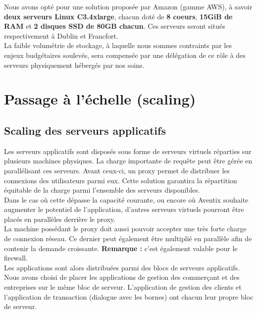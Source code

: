 Nous avons opté pour une solution proposée par Amazon (gamme AWS), à savoir
\textbf{deux serveurs Linux C3.4xlarge}, chacun doté de \textbf{8 coeurs},
\textbf{15GiB de RAM} et \textbf{2 disques SSD de 80GB chacun}. Ces serveurs
seront situés respectivement à Dublin et Francfort. \\

La faible volumétrie de stockage, à laquelle nous sommes contraints par les
enjeux budgétaires soulevés, sera compensée par une délégation de ce rôle à
des serveurs physiquement hébergés par nos soins.

\section{Passage à l'échelle (scaling)}
\label{sec:scaling}

\subsection{Scaling des serveurs applicatifs}
\label{subsec:scaling-applicatif}

Les serveurs applicatifs sont disposés sous forme de serveurs virtuels
réparties sur plusieurs machines physiques. La charge importante de requête
peut être gérée en parallélisant ces serveurs. Avant ceux-ci, un proxy permet
de distribuer les connexions des utilisateurs parmi eux. Cette solution
garantira la répartition équitable de la charge parmi l'ensemble des serveurs
disponibles. \\

Dans le cas où cette dépasse la capacité courante, ou encore où Aventix souhaite
augmenter le potentiel de l'application, d'autres serveurs virtuels pourront
être placés en parallèles derrière le proxy. \\

La machine possédant le proxy doit aussi pouvoir accepter une très forte charge
de connexion réseau. Ce dernier peut également être multiplié en parallèle afin
de contenir la demande croissante. \textbf{Remarque :} c'est également valable
pour le firewall. \\

Les applications sont alors distribuées parmi des blocs de serveurs
applicatifs. Nous avons choisi de placer les applications de gestion des
commerçant et des entreprises sur le même bloc de serveur. L'application de
gestion des clients et l'application de transaction (dialogue avec les bornes)
ont chacun leur propre bloc de serveur. \\

